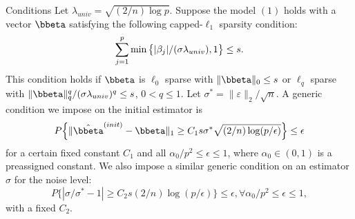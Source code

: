 \begin{frame}
\begin{block}{Conditions}
\scriptsize
    Let $\lambda_{univ}=\sqrt{(2/n)\log p}$. Suppose the model $(1)$ holds with a vector $\bbeta$ satisfying the following capped-$\ell_1$ sparsity condition:
\vspace{1mm}
\begin{equation}
\label{con19}
\setlength{\abovedisplayskip}{3pt} %
\setlength{\belowdisplayskip}{3pt}
\sum_{j=1}^p \min\big\{|\beta_j|/(\sigma \lambda_{univ}),1\big\} \leq s.
\end{equation}
This condition holds if $\bbeta$ is $\ell_0$ sparse with $\|\bbeta\|_0 \leq s$ or $\ell_q$ sparse with $\|\bbeta\|_q^q/(\sigma\lambda_{univ})^q \leq s$, $0<q \leq 1$.
    Let $\sigma^*=\|\varepsilon\|_2/\sqrt{n}$. A generic condition we impose on the initial estimator is
\vspace{1mm}
\begin{equation}
\label{con20}
P\Big\{ \|\hat{\bbeta}^{(init)} - \bbeta\|_1 \geq C_1 s \sigma^*\sqrt{(2/n)\log(p/\epsilon)}\Big\} \leq \epsilon
\end{equation}
for a certain fixed constant $C_1$ and all $\alpha_0/p^2 \leq \epsilon \leq 1$,
where $\alpha_0\in (0,1)$ is a preassigned constant.
We also impose a similar generic condition on an estimator $\hat{\sigma}$ for the noise level:
\vspace{1mm}
\begin{equation}
\label{con21}
P\Big\{ |\sigma/\sigma^* - 1 | \geq C_2 s (2/n)\log(p/\epsilon) \Big\} \leq \epsilon, \forall \alpha_0/p^2 \leq \epsilon \leq 1,
\end{equation}
with a fixed $C_2$.
\end{block}
\end{frame}

